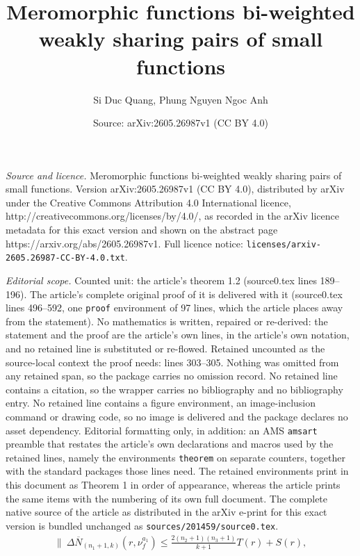\documentclass[10pt,a4paper]{amsart}
\title{Meromorphic functions bi-weighted weakly sharing pairs of small functions}
\author{Si Duc Quang, Phung Nguyen Ngoc Anh}
\date{Source: arXiv:2605.26987v1 (CC BY 4.0)}
\begin{document}
\maketitle

\noindent\emph{Source and licence.} Meromorphic functions bi-weighted weakly sharing pairs of small functions. Version arXiv:2605.26987v1 (CC BY 4.0), distributed by arXiv under the Creative Commons Attribution 4.0 International licence, http://creativecommons.org/licenses/by/4.0/, as recorded in the arXiv licence metadata for this exact version and shown on the abstract page https://arxiv.org/abs/2605.26987v1. Full licence notice: \texttt{licenses/arxiv-2605.26987-CC-BY-4.0.txt}.\par\smallskip

\noindent\textit{Editorial scope.} Counted unit: the article's theorem 1.2 (source0.tex lines 189--196). The article's complete original proof of it is delivered with it (source0.tex lines 496--592, one \texttt{proof} environment of 97 lines, which the article places away from the statement). No mathematics is written, repaired or re-derived: the statement and the proof are the article's own lines, in the article's own notation, and no retained line is substituted or re-flowed.  Retained uncounted as the source-local context the proof needs: lines 303--305.  Nothing was omitted from any retained span, so the package carries no omission record.  No retained line contains a citation, so the wrapper carries no bibliography and no bibliography entry.  No retained line contains a figure environment, an image-inclusion command or drawing code, so no image is delivered and the package declares no asset dependency.  Editorial formatting only, in addition: an AMS \texttt{amsart} preamble that restates the article's own declarations and macros used by the retained lines, namely the environments \texttt{theorem} on separate counters, together with the standard packages those lines need.  The retained environments print in this document as Theorem 1 in order of appearance, whereas the article prints the same items with the numbering of its own full document.  The complete native source of the article as distributed in the arXiv e-print for this exact version is bundled unchanged as \texttt{sources/201459/source0.tex}.
\begin{align}\label{3.5}
\|\ \Delta\overline N_{(n_1+1,k)}(r,\nu^{a_1}_f)\le \frac{2(n_2+1)(n_3+1)}{k+1}T(r)+S(r),
\end{align}
\end{document}
